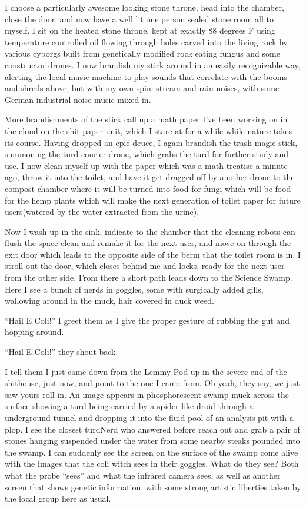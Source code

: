 I choose a particularly awesome looking stone throne, head into the
chamber, close the door, and now have a well lit one person sealed stone
room all to myself. I sit on the heated stone throne, kept at exactly 88
degrees F using temperature controlled oil flowing through holes carved
into the living rock by various cyborgs built from genetically modified
rock eating fungus and some constructor drones. I now brandish my stick
around in an easily recognizable way, alerting the local music machine
to play sounds that correlate with the booms and shreds above, but with
my own spin: stream and rain noises, with some German industrial noise
music mixed in.

More brandishments of the stick call up a math paper I've been working
on in the cloud on the shit paper unit, which I stare at for a while
while nature takes its course. Having dropped an epic deuce, I again
brandish the trash magic stick, summoning the turd courier drone, which
grabs the turd for further study and use. I now clean myself up with the
paper which was a math treatise a minute ago, throw it into the toilet,
and have it get dragged off by another drone to the compost chamber
where it will be turned into food for fungi which will be food for the
hemp plants which will make the next generation of toilet paper for
future users(watered by the water extracted from the urine).

Now I wash up in the sink, indicate to the chamber that the cleaning
robots can flush the space clean and remake it for the next user, and
move on through the exit door which leads to the opposite side of the
berm that the toilet room is in. I stroll out the door, which closes
behind me and locks, ready for the next user from the other side. From
there a short path leads down to the Science Swamp. Here I see a bunch
of nerds in goggles, some with surgically added gills, wallowing around
in the muck, hair covered in duck weed.

``Hail E Coli!'' I greet them as I give the proper gesture of rubbing
the gut and hopping around.

``Hail E Coli!'' they shout back.

I tell them I just came down from the Lemmy Pod up in the severe end of
the shithouse, just now, and point to the one I came from. Oh yeah, they
say, we just saw yours roll in. An image appears in phosphorescent swamp
muck across the surface showing a turd being carried by a spider-like
droid through a underground tunnel and dropping it into the fluid pool
of an analysis pit with a plop. I see the closest turdNerd who answered
before reach out and grab a pair of stones hanging suspended under the
water from some nearby steaks pounded into the swamp. I can suddenly see
the screen on the surface of the swamp come alive with the images that
the coli witch sees in their goggles. What do they see? Both what the
probe ``sees'' and what the infrared camera sees, as well as another
screen that shows genetic information, with some strong artistic
liberties taken by the local group here as usual.

